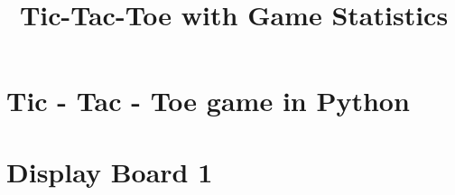 \documentclass[11pt]{article}
\title{Tic-Tac-Toe with Game Statistics}
\begin{document}
    
    \maketitle
    
    

    
    \hypertarget{tic---tac---toe-game-in-python}{%
\section{Tic - Tac - Toe game in
Python}\label{tic---tac---toe-game-in-python}}

    \hypertarget{display-board-1}{%
\section{Display Board 1}\label{display-board-1}}
\end{document}
